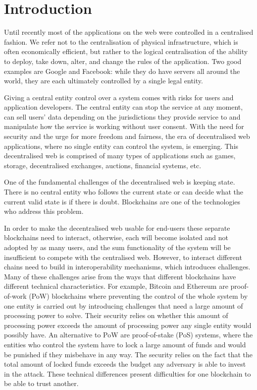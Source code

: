 \section{Introduction}\label{sec:intro}
Until recently most of the applications on the web were controlled in a centralised fashion.
We refer not to the centralisation of physical infrastructure, which is often economically efficient, but rather to the logical centralisation of the ability to deploy, take down, alter, and change the rules of the application.
Two good examples are Google and Facebook: while they do have servers all around the world, they are each ultimately controlled by a single legal entity.

Giving a central entity control over a system comes with risks for users and application developers.
The central entity can stop the service at any moment, can sell users' data depending on the jurisdictions they provide service to and manipulate how the service is working without user consent.
With the need for security and the urge for more freedom and fairness, the era of decentralised web applications, where no single entity can control the system, is emerging.
This decentralised web is comprised of many types of applications such as games, storage, decentralised exchanges, auctions, financial systems, etc.

One of the fundamental challenges of the decentralised web is keeping state. There is no central entity who follows the current state or can decide what the current valid state is if there is doubt.
Blockchains are one of the technologies who address this problem.

In order to make the decentralised web usable for end-users these separate blockchains need to interact, otherwise, each will become isolated and not adopted by as many users, and the sum functionality of the system will be insufficient to compete with the centralised web.
However, to interact different chains need to build in interoperability mechanisms, which introduces challenges. Many of these challenges arise from the ways that different blockchains have different technical characteristics. For example, Bitcoin and Ethereum are proof-of-work (PoW) blockchains where preventing the control of the whole system by one entity is carried out by introducing challenges that need a large amount of processing power to solve. Their security relies on whether this amount of processing power exceeds the amount of processing power any single entity would possibly have. An alternative to PoW are proof-of-stake (PoS) systems, where the entities who control the system have to lock a large amount of funds and would be punished if they misbehave in any way.
The security relies on the fact that the total amount of locked funds exceeds the budget any adversary is able to invest in the attack.
These technical differences present difficulties for one blockchain to be able to trust another.

